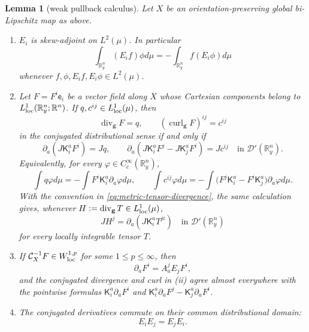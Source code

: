 \documentclass[11pt,reqno]{amsart}
\theoremstyle{plain}
\newtheorem{lemma}[theorem]{Lemma}
\theoremstyle{definition}
\theoremstyle{remark}
\numberwithin{equation}{section}
\DeclareMathOperator{\Div}{div}
\DeclareMathOperator{\curl}{curl}
\newcommand{\Kmat}{\mathsf K}
\newcommand{\eframe}{\mathsf e}   %
\newcommand{\gmetric}{\mathbf g}
\newcommand{\Real}{\mathbb R}
\newcommand{\Rn}{\Real^n}
\begin{document}
\begin{lemma}[weak pullback calculus]\label{lem:weak-pullback}
Let $X$ be an orientation-preserving global bi-Lipschitz map as above.
\begin{enumerate}
\item[(i)] $E_i$ is skew-adjoint on $L^2(\mu)$. In particular
  \[
   \int_{\Real_y^n}(E_if)\phi d\mu=-\int_{\Real_y^n}f(E_i\phi)d\mu
  \]
  whenever $f,\phi,E_if,E_i\phi\in L^2(\mu)$.
\item[(ii)] Let $F=F^i\eframe_i$ be a vector field along $X$ whose Cartesian components belong to $L^1_{\rm loc}(\Real^n_y;\Rn)$. If
  $q,c^{ij}\in L^1_{\rm loc}(\mu)$, then
  \[
   \Div_{\gmetric}F=q,
   \qquad
   (\curl_{\gmetric}F)^{ij}=c^{ij}
  \]
  in the conjugated distributional sense if and only if
  \[
   \partial_a(J\Kmat_i^aF^i)=Jq,
   \qquad
   \partial_a\!\left(J\Kmat_i^aF^j-J\Kmat_j^aF^i\right)=Jc^{ij}
   \quad\text{in }\mathcal D'(\Real^n_y).
  \]
  Equivalently, for every $\varphi\in C_c^\infty(\Real^n_y)$,
  \begin{equation}\label{eq:conservativeform}
   \int q\varphi d\mu=-\int F^i\Kmat_i^a\partial_a\varphi d\mu,\qquad
   \int c^{ij}\varphi d\mu=-\int\bigl(F^j\Kmat_i^a-F^i\Kmat_j^a\bigr)
          \partial_a\varphi d\mu.
  \end{equation}
  With the convention in \eqref{eq:metric-tensor-divergence}, the same
  calculation gives, whenever
  $H:=\Div_{\gmetric}T\in L^1_{\rm loc}(\mu)$,
  \begin{equation}\label{eq:conservative-tensor-divergence}
   JH^j
   =\partial_a(J\Kmat_i^aT^{ji})
   \quad\text{in }\mathcal D'(\Real_y^n)
  \end{equation}
  for every locally integrable tensor $T$.
\item[(iii)] If $\mathcal C_X^{-1}F\in W^{1,p}_{\rm loc}$ for some
  $1\le p\le\infty$, then 
  \begin{equation}\label{eq:biLipchainrule}
      \partial_aF^i=A_a^jE_jF^i,
  \end{equation}
  and the conjugated divergence and curl in
  (ii) agree almost everywhere with the pointwise formulas $\Kmat^a_i\partial_aF^i$ and
  $\Kmat^a_i\partial_aF^j-\Kmat^a_j\partial_aF^i$.
\item[(iv)] The conjugated derivatives commute on their common
distributional domain:
  \[
   E_iE_j=E_jE_i.
  \]
\end{enumerate}
\end{lemma}
\end{document}
